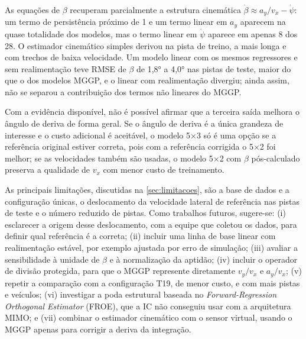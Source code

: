As equações de $\beta$ recuperam parcialmente a estrutura cinemática $\dot\beta \approx a_y/v_x - \dot\psi$: um termo de persistência próximo de 1 e um termo linear em $a_y$ aparecem na quase totalidade dos modelos, mas o termo linear em $\dot\psi$ aparece em apenas 8 dos 28. O estimador cinemático simples derivou na pista de treino, a mais longa e com trechos de baixa velocidade. Um modelo linear com os mesmos regressores e sem realimentação teve RMSE de $\beta$ de 1,8° a 4,0° nas pistas de teste, maior do que o dos modelos MGGP, e o linear com realimentação divergiu; ainda assim, não se separou a contribuição dos termos não lineares do MGGP.

Com a evidência disponível, não é possível afirmar que a terceira saída melhora o ângulo de deriva de forma geral. Se o ângulo de deriva é a única grandeza de interesse e o custo adicional é aceitável, o modelo 5×3 só é uma opção se a referência original estiver correta, pois com a referência corrigida o 5×2 foi melhor; se as velocidades também são usadas, o modelo 5×2 com $\beta$ pós-calculado preserva a qualidade de $v_x$ com menor custo de treinamento.

As principais limitações, discutidas na \autoref{sec:limitacoes}, são a base de dados e a configuração únicas, o deslocamento da velocidade lateral de referência nas pistas de teste e o número reduzido de pistas. Como trabalhos futuros, sugere-se: (i) esclarecer a origem desse deslocamento, com a equipe que coletou os dados, para definir qual referência é a correta; (ii) incluir uma linha de base linear com realimentação estável, por exemplo ajustada por erro de simulação; (iii) avaliar a sensibilidade à unidade de $\beta$ e à normalização da aptidão; (iv) incluir o operador de divisão protegida, para que o MGGP represente diretamente $v_y/v_x$ e $a_y/v_x$; (v) repetir a comparação com a configuração T19, de menor custo, e com mais pistas e veículos; (vi) investigar a poda estrutural baseada no \textit{Forward-Regression Orthogonal Estimator} (FROE), que a IC não conseguiu usar com a arquitetura MIMO; e (vii) combinar o estimador cinemático com o sensor virtual, usando o MGGP apenas para corrigir a deriva da integração.
